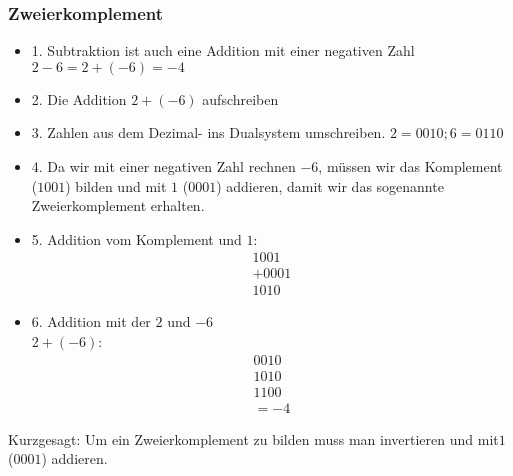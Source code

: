 \subsubsection{Zweierkomplement}
\begin{itemize}
    \item 1. Subtraktion ist auch eine Addition mit einer negativen Zahl $2 - 6 = 2 + (-6) = -4$
    \item 2. Die Addition $2 + (-6)$ aufschreiben
    \item 3. Zahlen aus dem Dezimal- ins Dualsystem umschreiben. $2 = 0010 ; 6 = 0110$
    \item 4. Da wir mit einer negativen Zahl rechnen $-6$, müssen wir das Komplement ($1001$) bilden und mit $1$ ($0001$) addieren, damit wir das sogenannte Zweierkomplement erhalten.
    \item 5. Addition vom Komplement und $1$: 
    \begin{align*}
        1001\\
        +0001\\
        \hline
        1010
    \end{align*}
    \item 6. Addition mit der $2$ und $-6$ \\
    $2 + (-6)$:
    \begin{align*}
        0010\\
        1010\\
        \hline
        1100\\
        = -4
    \end{align*}
\end{itemize}
\bigskip
Kurzgesagt: Um ein Zweierkomplement zu bilden muss man invertieren und mit$ 1$ ($0001$) addieren.
